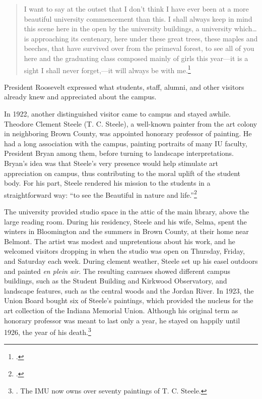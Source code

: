 \documentclass[
  american,
  letterpaper,
]{scrreprt}
\begin{document}
\begin{quote}
I want to say at the outset that I don't think I have ever been at a
more beautiful university commencement than this. I shall always keep in
mind this scene here in the open by the university buildings, a
university which\ldots is approaching its centenary, here under these
great trees, these maples and beeches, that have survived over from the
primeval forest, to see all of you here and the graduating class
composed mainly of girls this year---it is a sight I shall never
forget,---it will always be with me.\footnote{.}
\end{quote}

President Roosevelt expressed what students, staff, alumni, and other
visitors already knew and appreciated about the campus.

In 1922, another distinguished visitor came to campus and stayed awhile.
Theodore Clement Steele (T. C. Steele), a well-known painter from the
art colony in neighboring Brown County, was appointed honorary professor
of painting. He had a long association with the campus, painting
portraits of many IU faculty, President Bryan among them, before turning
to landscape interpretations. Bryan's idea was that Steele's very
presence would help stimulate art appreciation on campus, thus
contributing to the moral uplift of the student body. For his part,
Steele rendered his mission to the students in a straightforward way:
``to see the Beautiful in nature and life.''\footnote{.}

The university provided studio space in the attic of the main library,
above the large reading room. During his residency, Steele and his wife,
Selma, spent the winters in Bloomington and the summers in Brown County,
at their home near Belmont. The artist was modest and unpretentious
about his work, and he welcomed visitors dropping in when the studio was
open on Thursday, Friday, and Saturday each week. During clement
weather, Steele set up his easel outdoors and painted \emph{en plein
air}. The resulting canvases showed different campus buildings, such as
the Student Building and Kirkwood Observatory, and landscape features,
such as the central woods and the Jordan River. In 1923, the Union Board
bought six of Steele's paintings, which provided the nucleus for the art
collection of the Indiana Memorial Union. Although his original term as
honorary professor was meant to last only a year, he stayed on happily
until 1926, the year of his death.\footnote{. The IMU now owns over seventy paintings of T. C. Steele.}
\end{document}
